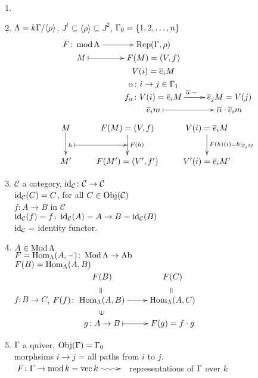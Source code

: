 
\begin{exam}
\begin{enumerate}
\item[]
\item $\Lambda = k\Gamma/\langle\rho \rangle$, $J^t \subseteq \langle \rho
  \rangle \subseteq J^2$, $\Gamma_0 = \{ 1, 2, \ldots, n \}$ 
\[\xymatrix@R-2pc{
F\colon  \mod\Lambda \ar[r] & \Rep(\G, \rho)\\
M \ar@{|->}[r] & F(M) = (V,f)\\
& V(i) = \overline{e}_iM\\
& \alpha\colon  i \to j \in \G_1\\
& f_\alpha \colon  V(i)= \overline{e}_iM \ar[r]^{\overline{\alpha} \cdot -} & \overline{e}_j M= V(j)\\
& \overline{e}_i m \ar@{|->}[r] & \overline{\alpha}\cdot\overline{e}_i m
}\]
\[\xymatrix{
M \ar[d]^h="h" & F(M)=(V,f) \ar[d]^{F(h)}="F(h)" \ar@{|->}"h";"F(h)" & V(i) =  \overline{e}_i M \ar[d]^{F(h)(i) = h\mid_{\overline{e}_i M}}\\
M' & F(M') = (V', f') & V'(i) = \overline{e}_i M'
}\]

\item $\mathcal{C}$ a category, $\operatorname{id}\nolimits_\mathcal{C}\colon  \mathcal{C} \to \mathcal{C}$\\
$\operatorname{id}\nolimits_\mathcal{C}(C) = C$, for all $C \in \operatorname{Obj}(\mathcal{C})$\\
$f\colon A \to B$ in $\mathcal{C}$\\
$\operatorname{id}\nolimits_\mathcal{C}(f) = f\colon  \operatorname{id}\nolimits_\mathcal{C}(A) = A \to B = \operatorname{id}\nolimits_\mathcal{C}(B)$\\
$\operatorname{id}\nolimits_\mathcal{C} =$ identity functor.

\item $A \in \operatorname{Mod} \Lambda$\\
$F = \operatorname{Hom}_\Lambda(A, -)\colon  \operatorname{Mod}\Lambda \to \operatorname{Ab}\nolimits$\\
$F(B) =  \operatorname{Hom}_\Lambda(A, B)$\\
$f\colon  B \to C$, $F(f)\colon  \vcenter{\xymatrix@R-1pc{
F(B) \ar@{}[d]|-*[@]{=} & F(C) \ar@{}[d]|-*[@]{=}\\
\Hom_\Lambda(A,B) \ar@{}[d]|-*[@]{\ni} \ar[r] & \Hom_\Lambda(A, C)\\
g\colon  A\to B \ar@{|->}[r] & F(g) = f\cdot g
}}$

\item $\Gamma$ a quiver, $\operatorname{Obj}(\Gamma) = \Gamma_0$\\
morphsims $i\to j$ = all paths from $i$ to $j$.\\
$\xymatrix{F\colon  \G \to \mod k = \vec k \ar@{~>}[r]&}$ representations of $\Gamma$ over $k$
\end{enumerate}
\end{exam}

